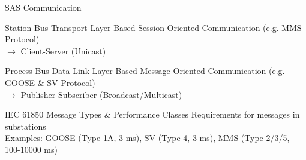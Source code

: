 \documentclass[en]{sdqbeamer}
\begin{document}
\begin{frame}{SAS Communication}
    \begin{blueblock}{Station Bus}
        Transport Layer-Based Session-Oriented Communication (e.g. MMS Protocol)
        \\$\rightarrow$ Client-Server (Unicast)
    \end{blueblock}
    \begin{blueblock}{Process Bus}
        Data Link Layer-Based Message-Oriented Communication (e.g. GOOSE \& SV Protocol)
        \\$\rightarrow$ Publisher-Subscriber (Broadcast/Multicast)
    \end{blueblock}
    \begin{grayblock}{IEC 61850 Message Types \& Performance Classes \parencite*{IEC61850P5,IEC61850P8}}
        Requirements for messages in substations
        \\Examples: GOOSE (Type 1A, 3 ms), SV (Type 4, 3 ms), MMS (Type 2/3/5, 100-10000 ms)
    \end{grayblock}
\end{frame}
\end{document}
